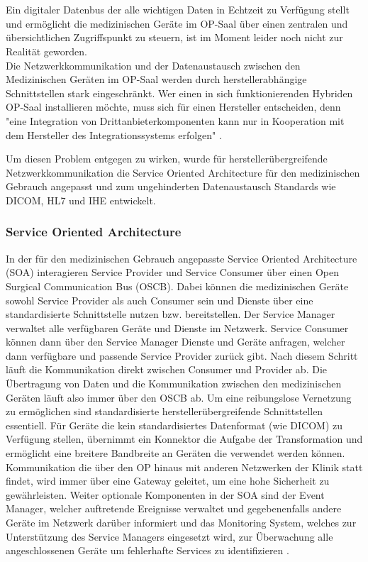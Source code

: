 \chapter{}
\label{sec:overview}

Ein digitaler Datenbus der alle wichtigen Daten in Echtzeit zu Verfügung stellt und ermöglicht die medizinischen Geräte im OP-Saal über einen zentralen und übersichtlichen Zugriffspunkt zu steuern, ist im Moment leider noch nicht zur Realität geworden.\\
Die Netzwerkkommunikation und der Datenaustausch zwischen den Medizinischen Geräten im OP-Saal werden durch herstellerabhängige Schnittstellen stark eingeschränkt. Wer einen in sich funktionierenden Hybriden OP-Saal installieren möchte, muss sich für einen Hersteller entscheiden, denn "eine Integration von Drittanbieterkomponenten kann nur in Kooperation mit dem Hersteller des Integrationssystems erfolgen" \cite{DerDigitaleOperationssaal}.

Um diesen Problem entgegen zu wirken, wurde für herstellerübergreifende Netzwerkkommunikation die Service Oriented Architecture für den medizinischen Gebrauch angepasst und zum ungehinderten Datenaustausch Standards wie DICOM, HL7 und IHE entwickelt.

\subsection{Service Oriented Architecture}
In der für den medizinischen Gebrauch angepasste Service Oriented Architecture (SOA) interagieren Service Provider und Service Consumer über einen Open Surgical Communication Bus (OSCB). Dabei können die medizinischen Geräte sowohl Service Provider als auch Consumer sein und Dienste über eine standardisierte Schnittstelle nutzen bzw. bereitstellen. Der Service Manager verwaltet alle verfügbaren Geräte und Dienste im Netzwerk. Service Consumer können dann über den Service Manager Dienste und Geräte anfragen, welcher dann verfügbare und passende Service Provider zurück gibt. Nach diesem Schritt läuft die Kommunikation direkt zwischen Consumer und Provider ab. 
Die Übertragung von Daten und die Kommunikation zwischen den medizinischen Geräten läuft also immer über den OSCB ab. Um eine reibungslose Vernetzung zu ermöglichen sind standardisierte herstellerübergreifende Schnittstellen essentiell.  
Für Geräte die kein standardisiertes Datenformat (wie DICOM) zu Verfügung stellen, übernimmt ein Konnektor die Aufgabe der Transformation und ermöglicht eine breitere Bandbreite an Geräten die verwendet werden können. Kommunikation die über den OP hinaus mit anderen Netzwerken der Klinik statt findet, wird immer über eine Gateway geleitet, um eine hohe Sicherheit zu gewährleisten.
Weiter optionale Komponenten in der SOA sind der Event Manager, welcher auftretende Ereignisse verwaltet und gegebenenfalls andere Geräte im Netzwerk darüber informiert und das Monitoring System, welches zur Unterstützung des Service Managers eingesetzt wird, zur Überwachung alle angeschlossenen Geräte um fehlerhafte Services zu identifizieren \cite{DerDigitaleOperationssaal}. 

